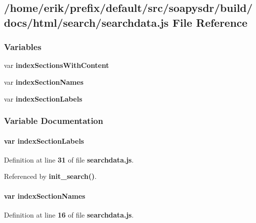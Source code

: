 \subsection{/home/erik/prefix/default/src/soapysdr/build/docs/html/search/searchdata.js File Reference}
\label{searchdata_8js}
\subsubsection*{Variables}
\begin{DoxyCompactItemize}
\item 
var {\bf index\+Sections\+With\+Content}
\item 
var {\bf index\+Section\+Names}
\item 
var {\bf index\+Section\+Labels}
\end{DoxyCompactItemize}


\subsubsection{Variable Documentation}
\paragraph[{index\+Section\+Labels}]{\setlength{\rightskip}{0pt plus 5cm}var index\+Section\+Labels}\label{searchdata_8js_a529972e449c82dc118cbbd3bcf50c44d}


Definition at line {\bf 31} of file {\bf searchdata.\+js}.



Referenced by {\bf init\+\_\+search()}.

\paragraph[{index\+Section\+Names}]{\setlength{\rightskip}{0pt plus 5cm}var index\+Section\+Names}\label{searchdata_8js_a77149ceed055c6c6ce40973b5bdc19ad}


Definition at line {\bf 16} of file {\bf searchdata.\+js}.



